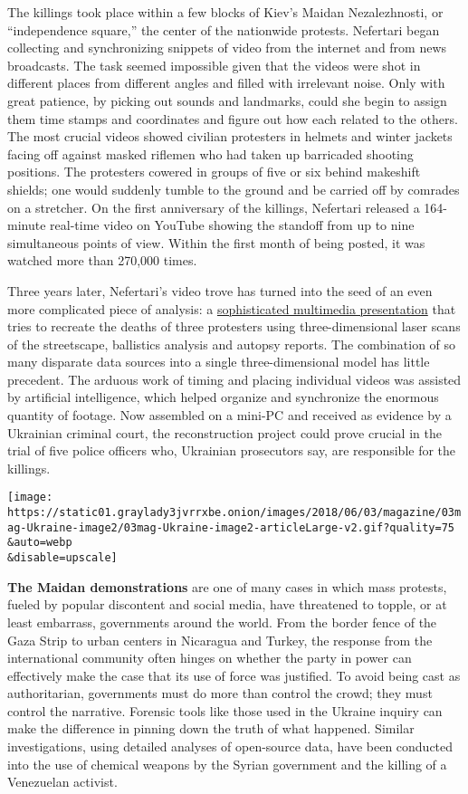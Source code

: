The killings took place within a few blocks of Kiev's Maidan
Nezalezhnosti, or ``independence square,'' the center of the nationwide
protests. Nefertari began collecting and synchronizing snippets of video
from the internet and from news broadcasts. The task seemed impossible
given that the videos were shot in different places from different
angles and filled with irrelevant noise. Only with great patience, by
picking out sounds and landmarks, could she begin to assign them time
stamps and coordinates and figure out how each related to the others.
The most crucial videos showed civilian protesters in helmets and winter
jackets facing off against masked riflemen who had taken up barricaded
shooting positions. The protesters cowered in groups of five or six
behind makeshift shields; one would suddenly tumble to the ground and be
carried off by comrades on a stretcher. On the first anniversary of the
killings, Nefertari released a 164-minute real-time video on YouTube
showing the standoff from up to nine simultaneous points of view. Within
the first month of being posted, it was watched more than 270,000 times.

Three years later, Nefertari's video trove has turned into the seed of
an even more complicated piece of analysis: a
\href{http://maidan.situplatform.com/}{sophisticated multimedia
presentation} that tries to recreate the deaths of three protesters
using three-dimensional laser scans of the streetscape, ballistics
analysis and autopsy reports. The combination of so many disparate data
sources into a single three-dimensional model has little precedent. The
arduous work of timing and placing individual videos was assisted by
artificial intelligence, which helped organize and synchronize the
enormous quantity of footage. Now assembled on a mini-PC and received as
evidence by a Ukrainian criminal court, the reconstruction project could
prove crucial in the trial of five police officers who, Ukrainian
prosecutors say, are responsible for the killings.

\texttt{[image: https://static01.graylady3jvrrxbe.onion/images/2018/06/03/magazine/03mag-Ukraine-image2/03mag-Ukraine-image2-articleLarge-v2.gif?quality=75\\\&auto=webp\\\&disable=upscale]}

\textbf{The Maidan demonstrations} are one of many cases in which mass
protests, fueled by popular discontent and social media, have threatened
to topple, or at least embarrass, governments around the world. From the
border fence of the Gaza Strip to urban centers in Nicaragua and Turkey,
the response from the international community often hinges on whether
the party in power can effectively make the case that its use of force
was justified. To avoid being cast as authoritarian, governments must do
more than control the crowd; they must control the narrative. Forensic
tools like those used in the Ukraine inquiry can make the difference in
pinning down the truth of what happened. Similar investigations, using
detailed analyses of open-source data, have been conducted into the use
of chemical weapons by the Syrian government and the killing of a
Venezuelan activist.

